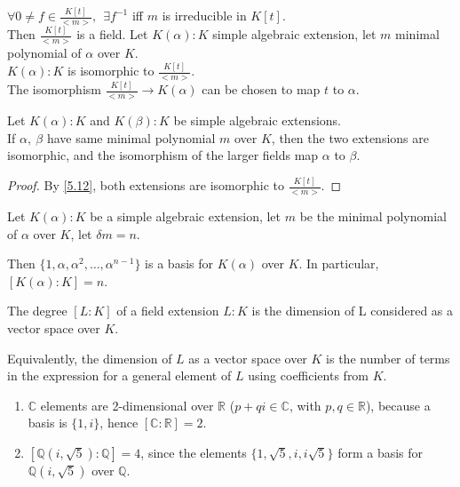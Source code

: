 \documentclass{article}
\theoremstyle{definition}
\newenvironment{defn}[1]
{\renewcommand\theinnerdefn{#1}\innerdefn}
{\endinnerdefn}
\newenvironment{thm}[1]
{\renewcommand\theinnerthm{#1}\innerthm}
{\endinnerthm}
\newenvironment{lemma}[1]
{\renewcommand\theinnerlemma{#1}\innerlemma}
{\endinnerlemma}
\newenvironment{cor}[1]
{\renewcommand\theinnercor{#1}\innercor}
{\endinnercor}
\newenvironment{eg}[1]
{\renewcommand\theinnereg{#1}\innereg}
{\endinnereg}
\begin{document}
\begin{thm}{5.10}
  $\forall 0 \neq f \in \frac{K[t]}{<m>},~~ \exists f^{-1}$ iff $m$ is irreducible in $K[t]$.\\
  Then $\frac{K[t]}{<m>}$ is a field.
\end{thm}
\begin{thm}{5.12} \label{5.12}
  Let $K(\alpha):K$ simple algebraic extension, let $m$ minimal polynomial of $\alpha$ over $K$.\\
  $K(\alpha):K$ is isomorphic to $\frac{K[t]}{<m>}$.\\
  The isomorphism $\frac{K[t]}{<m>} \longrightarrow K(\alpha)$ can be chosen to map $t$ to $\alpha$.

\end{thm}
\begin{cor}{5.13} \label{5.13}
  Let $K(\alpha):K$ and $K(\beta):K$ be simple algebraic extensions.\\
  If $\alpha,~ \beta$ have same minimal polynomial $m$ over $K$, then the two extensions are isomorphic, and the isomorphism of the larger fields map $\alpha$ to $\beta$.
\end{cor}
\begin{proof}
  By \ref{5.12}, both extensions are isomorphic to $\frac{K[t]}{<m>}$.
\end{proof}

\begin{lemma}{5.14}
  Let $K(\alpha):K$ be a simple algebraic extension, let $m$ be the minimal polynomial of $\alpha$ over $K$, let $\delta m =n$.

  Then $\{1, \alpha, \alpha^2, \ldots, \alpha^{n-1}\}$ is a basis for $K(\alpha)$ over $K$.
  In particular, $[K(\alpha):K]=n$.
\end{lemma}

\begin{defn}{6.2}
  The degree $[L:K]$ of a field extension $L:K$ is the dimension of L considered as a vector space over $K$.

  Equivalently, the dimension of $L$ as a vector space over $K$ is the number of terms in the expression for a general element of $L$ using coefficients from $K$.
\end{defn}

\begin{eg}{6.3}
  \begin{enumerate}
    \item $\mathbb{C}$ elements are 2-dimensional over $\mathbb{R}$ ($p+qi \in \mathbb{C}$, with $p,q \in \mathbb{R}$), because a basis is $\{1, i\}$, hence $[\mathbb{C}:\mathbb{R}]=2$.
    \item $[ \mathbb{Q}(i, \sqrt{5}) : \mathbb{Q}]=4$, since the elements $\{1, \sqrt{5}, i, i\sqrt{5}\}$ form a basis for $\mathbb{Q}(i, \sqrt{5})$ over $\mathbb{Q}$.
  \end{enumerate}
\end{eg}
\end{document}
